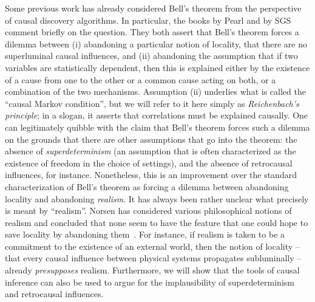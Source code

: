 \documentclass[letterpaper,onecolumn,nofootinbib]{revtex4}
\begin{document}
Some previous work has already considered Bell's theorem from the perspective of causal discovery algorithms.
In particular, the books by Pearl  \cite{Pearl2009} and by SGS \cite{Spirtes2001} comment briefly on the question. They both assert that Bell's theorem forces a dilemma between (i) abandoning a particular notion of locality, that there are no superluminal causal influences, and  
(ii) abandoning the assumption that if two variables are statistically dependent, then this is explained either by the existence of a cause from one to the other or a common cause acting on both, or a combination of the two mechanisms.  Assumption (ii) underlies what is called the ``causal Markov condition'', but we will refer to it here simply as \emph{Reichenbach's principle}; in a slogan, it asserts that correlations must be explained causally.  \color{black}
One can legitimately quibble with 
the claim that Bell's theorem forces such a dilemma
on the grounds that there are other assumptions that go into the theorem:  the absence of {\em superdeterminism} (an assumption that is often characterized as the existence of freedom in the choice of settings), and the absence of retrocausal influences, for instance.  
Nonetheless, this is an improvement over the standard characterization of Bell's theorem as forcing a dilemma between abandoning locality and abandoning \emph{realism}.  It has always been rather unclear what precisely is meant by ``realism''.  Norsen has considered various philosophical notions of realism and concluded that none seem to have the feature that one could hope to save locality by abandoning them~\cite{norsen2007against}.  For instance, if realism is taken to be a commitment to the existence of an external world, then the notion of locality -- that every causal influence between physical systems propagates subluminally -- already \emph{presupposes} realism.
Furthermore, we will show that the tools of causal inference can also be used to argue for the implausibility of superdeterminism and retrocausal influences.
\end{document}

